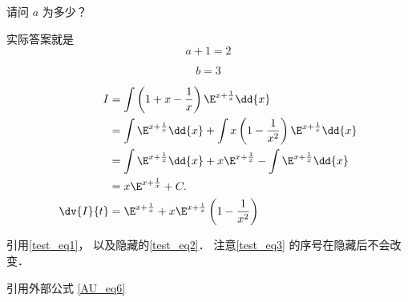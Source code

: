 \begin{example}{}
请问 $a$ 为多少？
\pay

实际答案就是
\begin{equation}\label{test_eq2}
a + 1 = 2
\end{equation}
\paid
\end{example}

\begin{equation}\label{test_eq3}
b = 3
\end{equation}

\begin{align}
I&=\int{\left(1+x-\frac{1}{x}\right)\E^{x+\frac{1}{x}}}\dd{x} \\
&=\int \E^{x+\frac{1}{x}}\dd{x}+\int{x\left(1-\frac{1}{x^2}\right)\E^{x+\frac{1}{x}}}\dd{x} \\
&=\int \E^{x+\frac{1}{x}}\dd{x}+x\E^{x+\frac{1}{x}}-\int \E^{x+\frac{1}{x}}\dd{x} \\
&=x \E^{x+\frac{1}{x}}+C. \\
\dv{I}{t}&=\E^{x+\frac{1}{x}}+x\E^{x+\frac{1}{x}}\left(1-\frac{1}{x^2}\right)
\end{align}

引用\autoref{test_eq1}， 以及隐藏的\autoref{test_eq2}． 注意\autoref{test_eq3} 的序号在隐藏后不会改变．

引用外部公式 \autoref{AU_eq6}~
